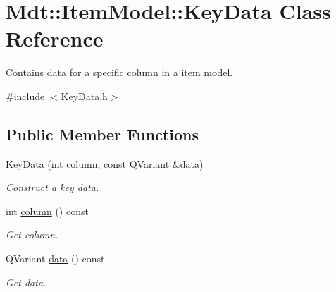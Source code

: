 \hypertarget{class_mdt_1_1_item_model_1_1_key_data}{}\section{Mdt\+:\+:Item\+Model\+:\+:Key\+Data Class Reference}
\label{class_mdt_1_1_item_model_1_1_key_data}


Contains data for a specific column in a item model.  




{\ttfamily \#include $<$Key\+Data.\+h$>$}

\subsection*{Public Member Functions}
\begin{DoxyCompactItemize}
\item 
\hyperlink{class_mdt_1_1_item_model_1_1_key_data_ab552f179780251feb2f0a20294d8efb4}{Key\+Data} (int \hyperlink{class_mdt_1_1_item_model_1_1_key_data_a90de72d8a7e660a4792e0a757e22fdd7}{column}, const Q\+Variant \&\hyperlink{class_mdt_1_1_item_model_1_1_key_data_a0e4fc54c7f6c7956cdf244c6f2e1f393}{data})
\begin{DoxyCompactList}\small\item\em Construct a key data. \end{DoxyCompactList}\item 
int \hyperlink{class_mdt_1_1_item_model_1_1_key_data_a90de72d8a7e660a4792e0a757e22fdd7}{column} () const \hypertarget{class_mdt_1_1_item_model_1_1_key_data_a90de72d8a7e660a4792e0a757e22fdd7}{}\label{class_mdt_1_1_item_model_1_1_key_data_a90de72d8a7e660a4792e0a757e22fdd7}

\begin{DoxyCompactList}\small\item\em Get column. \end{DoxyCompactList}\item 
Q\+Variant \hyperlink{class_mdt_1_1_item_model_1_1_key_data_a0e4fc54c7f6c7956cdf244c6f2e1f393}{data} () const \hypertarget{class_mdt_1_1_item_model_1_1_key_data_a0e4fc54c7f6c7956cdf244c6f2e1f393}{}\label{class_mdt_1_1_item_model_1_1_key_data_a0e4fc54c7f6c7956cdf244c6f2e1f393}

\begin{DoxyCompactList}\small\item\em Get data. \end{DoxyCompactList}\end{DoxyCompactItemize}


